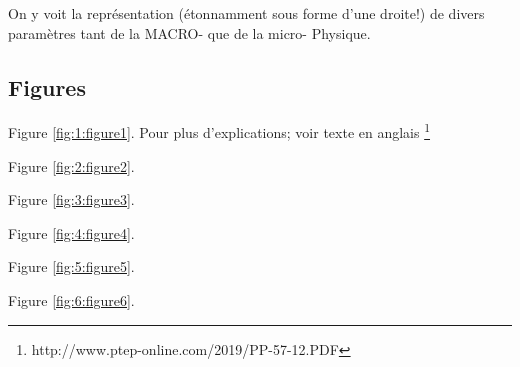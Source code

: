 \documentclass[a4paper,12pt]{article}
\begin{document}
On y voit la représentation (étonnamment sous forme d'une droite!) de divers paramètres tant de la MACRO- que de la micro- Physique.


\subsection{Figures}

Figure \ref{fig:1:figure1}. Pour plus d'explications; voir texte en anglais \footnote{http://www.ptep-online.com/2019/PP-57-12.PDF}

Figure \ref{fig:2:figure2}.

Figure \ref{fig:3:figure3}.

Figure \ref{fig:4:figure4}.

Figure \ref{fig:5:figure5}.

Figure \ref{fig:6:figure6}.
\end{document}
